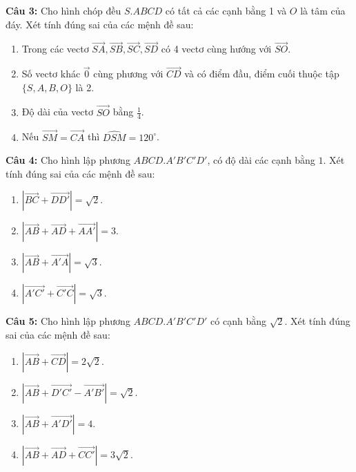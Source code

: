 \documentclass[12pt]{article}
\begin{document}
	\vspace{0.2cm}
	\noindent \textbf{Câu 3:} Cho hình chóp đều $S.ABCD$ có tất cả các cạnh bằng 1 và $O$ là tâm của đáy. Xét tính đúng sai của các mệnh đề sau:
	\begin{enumerate}[label=\alph*)]
		\item Trong các vectơ $\overrightarrow{SA}, \overrightarrow{SB}, \overrightarrow{SC}, \overrightarrow{SD}$ có 4 vectơ cùng hướng với $\overrightarrow{SO}$.
		\item Số vectơ khác $\vec{0}$ cùng phương với $\overrightarrow{CD}$ và có điểm đầu, điểm cuối thuộc tập $\{S, A, B, O\}$ là 2.
		\item Độ dài của vectơ $\overrightarrow{SO}$ bằng $\frac{1}{4}$.
		\item Nếu $\overrightarrow{SM} = \overrightarrow{CA}$ thì $\widehat{DSM} = 120^\circ$.
	\end{enumerate}
	
	\noindent \textbf{Câu 4:} Cho hình lập phương $ABCD.A'B'C'D'$, có độ dài các cạnh bằng $1$. Xét tính đúng sai của các mệnh đề sau:
	\begin{enumerate}[label=\alph*)]
		\item $|\overrightarrow{BC} + \overrightarrow{DD'}| = \sqrt{2}$.
		\item $|\overrightarrow{AB} + \overrightarrow{AD} + \overrightarrow{AA'}| = 3$.
		\item $|\overrightarrow{AB} + \overrightarrow{A'A}| = \sqrt{3}$.
		\item $|\overrightarrow{A'C'} + \overrightarrow{C'C}| = \sqrt{3}$.
	\end{enumerate}
	
	\vspace{0.2cm}
	\noindent \textbf{Câu 5:} Cho hình lập phương $ABCD.A'B'C'D'$ có cạnh bằng $\sqrt{2}$. Xét tính đúng sai của các mệnh đề sau:
	\begin{enumerate}[label=\alph*)]
		\item $|\overrightarrow{AB} + \overrightarrow{CD}| = 2\sqrt{2}$.
		\item $|\overrightarrow{AB} + \overrightarrow{D'C'} - \overrightarrow{A'B'}| = \sqrt{2}$.
		\item $|\overrightarrow{AB} + \overrightarrow{A'D'}| = 4$.
		\item $|\overrightarrow{AB} + \overrightarrow{AD} + \overrightarrow{CC'}| = 3\sqrt{2}$.
	\end{enumerate}
	
\end{document}
